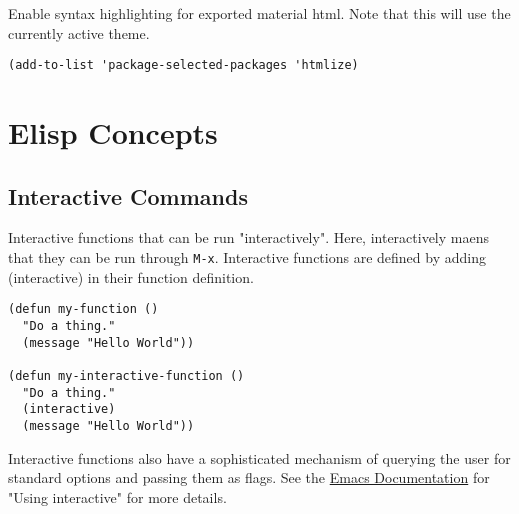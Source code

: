 \documentclass[11pt]{article}
\begin{document}
Enable syntax highlighting for exported material html. Note that this will use
the currently active theme.

\begin{verbatim}
(add-to-list 'package-selected-packages 'htmlize)
\end{verbatim}
\section{Elisp Concepts}
\label{sec:orgba51f1a}

\subsection{Interactive Commands}
\label{sec:org432f39c}

Interactive functions that can be run "interactively". Here, interactively maens
that they can be run through \texttt{M-x}. Interactive functions are defined by adding
(interactive) in their function definition.

\begin{verbatim}
(defun my-function ()
  "Do a thing."
  (message "Hello World"))

(defun my-interactive-function ()
  "Do a thing."
  (interactive)
  (message "Hello World"))
\end{verbatim}

Interactive functions also have a sophisticated mechanism of querying the user
for standard options and passing them as flags. See the \href{https://www.gnu.org/software/emacs/manual/html\_node/elisp/Using-Interactive.html}{Emacs Documentation} for
"Using interactive" for more details.
\end{document}
